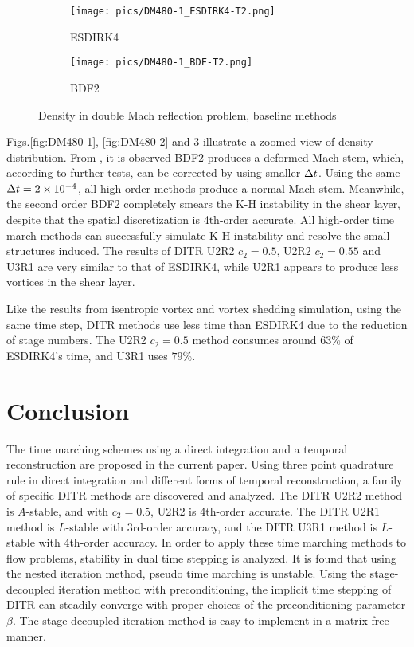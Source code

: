 \begin{figure}[htbp]
    \centering
    \begin{subfigure}{0.5\textwidth}
        \texttt{[image: pics/DM480-1\_ESDIRK4-T2.png]}
        \caption[]{ESDIRK4}
        \label{sfig:DM480_ESDIRK4}
    \end{subfigure}\hfill
    \begin{subfigure}{0.5\textwidth}
        \texttt{[image: pics/DM480-1\_BDF-T2.png]}
        \caption[]{BDF2}
        \label{sfig:DM480_BDF2}
    \end{subfigure}
    \caption{Density in double Mach reflection problem, baseline methods}
    \label{fig:DM480-3}
\end{figure}

Figs.\ref{fig:DM480-1}, \ref{fig:DM480-2} and \ref{fig:DM480-3}
illustrate a zoomed view of density distribution.
From  ,
it is observed BDF2 produces
a deformed Mach stem, which, according
to further tests, can be
corrected by using smaller ${\Delta} t$.
Using the same ${\Delta} t= 2\times10^{-4}$,
all high-order methods produce a
normal Mach stem.
Meanwhile, the second order BDF2
completely smears the K-H instability
in the shear layer, despite that the spatial
discretization is 4th-order accurate.
All high-order time march methods can successfully
simulate K-H instability and resolve the
small structures induced.
The results of DITR U2R2 $c_2=0.5$, U2R2  $c_2=0.55$
and U3R1 are very similar to that of ESDIRK4, while U2R1
appears to produce less vortices in the shear layer.

Like the results from isentropic vortex and vortex shedding simulation,
using the same time step, DITR methods
use less time than ESDIRK4 due to the reduction of stage numbers.
The U2R2 $c_2=0.5$ method consumes around $63\%$ of ESDIRK4's time,
and U3R1 uses $79\%$.



\section{Conclusion}
\label{sec:Conc}

The time marching schemes using a
direct integration and a temporal reconstruction 
are proposed in the current paper.
Using three point quadrature rule in direct integration and different
forms of temporal reconstruction, a family of
specific DITR methods are discovered and analyzed.
The DITR U2R2 method is $A$-stable, and with $c_2=0.5$, U2R2 is 4th-order accurate.
The DITR U2R1 method is $L$-stable with 3rd-order accuracy, and
the DITR U3R1 method is $L$-stable with 4th-order accuracy.
In order to apply these time marching methods to flow problems,
stability in dual time stepping is analyzed.
It is found that using the nested iteration method, 
pseudo time marching is unstable.
Using the stage-decoupled iteration method with preconditioning,
the implicit time stepping of DITR can steadily converge with proper choices of
the preconditioning parameter $\beta$.
The stage-decoupled iteration method is easy to implement in a
matrix-free manner.

